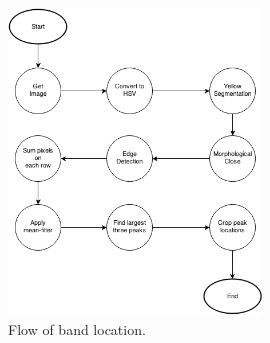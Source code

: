 \begin{figure}[ht]
    \centering
    \includegraphics[width=0.6\textwidth]{plaatjes/find-band-flow}
    \caption{Flow of band location.}
    \label{fig:find-band-flow}
\end{figure}

